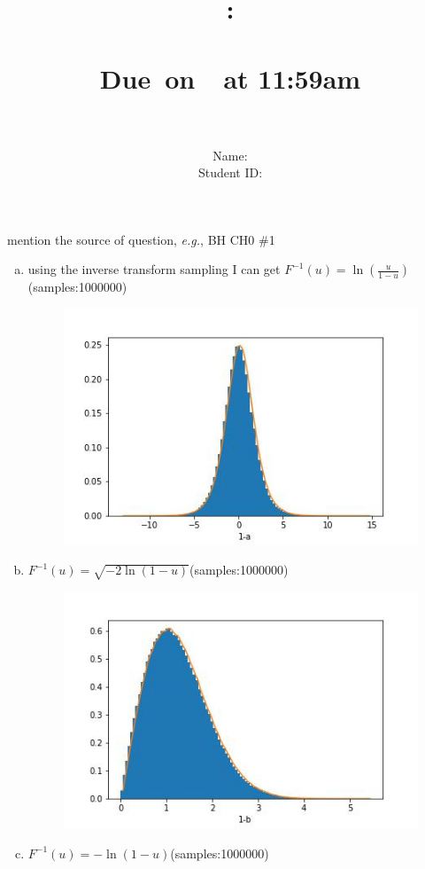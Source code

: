 \documentclass{article}
\title{
    \vspace{2in}
    \textmd{\textbf{\hmwkClass:\\  \hmwkTitle}}\\
    \normalsize\vspace{0.1in}\small{Due\ on\ \hmwkDueDate\ at 11:59am}\\
   \vspace{2in}\Huge{\hmwkClassID}\\   
   \vspace{2in}
}
\author{
	Name: \textbf{\hmwkAuthorName} \\
	Student ID: \hmwkAuthorID}
\date{}
\begin{document}
\maketitle
\pagebreak

\begin{homeworkProblem}{{\color{blue}mention the source of question}, \textit{e.g.}, BH CH0 \#1}
\begin{enumerate}[(a)]

	\item using the inverse transform sampling I can get $F^{-1}(u)=\ln\left( \frac{u}{1-u}\right)$(samples:1000000)
	\begin{figure}[htbp]
		\includegraphics[width=\linewidth]{1-a.jpg}
	\end{figure}
	\newpage
	\item  $F^{-1}(u)=\sqrt{-2\ln(1-u)}$(samples:1000000)
	\begin{figure}[htbp]
		\includegraphics[width=\linewidth]{1-b.jpg}
	\end{figure}
	\newpage
	\item  $F^{-1}(u)= -\ln(1-u)$(samples:1000000)
	

\end{enumerate}
\end{homeworkProblem}
\end{document}

